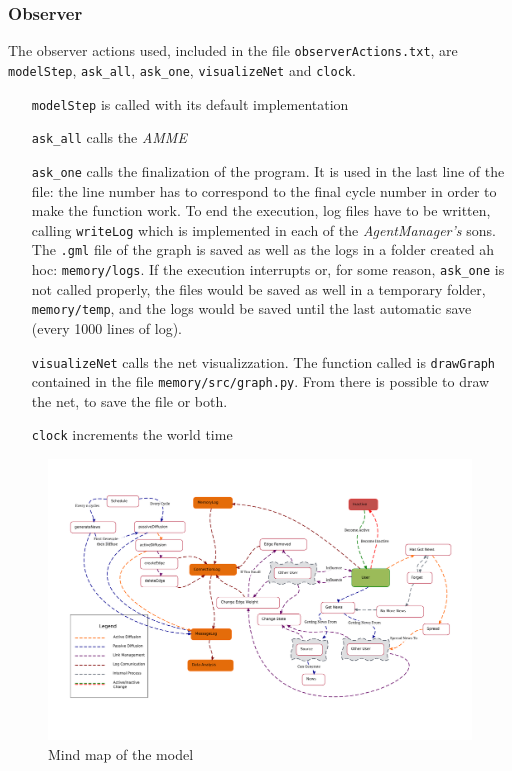 \subsubsection{Observer}
The observer actions used, included in the file \texttt{observerActions.txt},
are \texttt{modelStep}, \texttt{ask\_all}, \texttt{ask\_one},
\texttt{visualizeNet} and \texttt{clock}.
\begin{itemize}
\item[\texttt{modelStep}] is called with its default implementation
\item[\texttt{ask\_all}] calls the \textit{AMME}
\item[\texttt{ask\_one}] calls the finalization of the program. It
  is used in the last line of the file: the line number has to correspond
  to the final cycle number in order to make the function work.
  To end the execution, log files have to be written, calling
  \texttt{writeLog} which is implemented in each of the \textit{AgentManager's}
  sons. The \texttt{.gml} file of the graph is saved as well as the logs
  in a folder created ah hoc: \texttt{memory/logs}.
  If the execution interrupts or, for some reason, \texttt{ask\_one} is not
  called properly, the files would be saved as well in a temporary folder,
  \texttt{memory/temp}, and the logs would be saved until the last
  automatic save (every 1000 lines of log).
\item[\texttt{visualizeNet}] calls the net visualizzation. The function called
  is \texttt{drawGraph} contained in the file \texttt{memory/src/graph.py}.
  From there is possible to draw the net, to save the file or both.
\item[\texttt{clock}] increments the world time 
\end{itemize}

\begin{figure}[htpb]
  \centering
  \includegraphics[width=\columnwidth]{img/pdf/mindMap.pdf}
  \caption{Mind map of the model}
  \label{fig:mindmap}
\end{figure}

